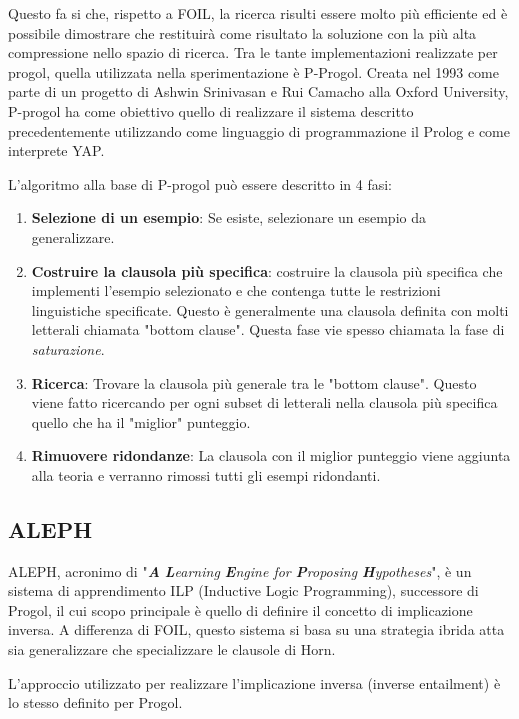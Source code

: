 Questo fa si che, rispetto a FOIL, la ricerca risulti essere molto più efficiente ed è possibile dimostrare che restituirà come risultato la soluzione con la più alta compressione nello spazio di ricerca.
\nocite{wiki:progol}
\nocite{pprogol}
Tra le tante implementazioni realizzate per progol, quella utilizzata nella sperimentazione è P-Progol. Creata nel 1993 come parte di un progetto di Ashwin Srinivasan e Rui Camacho alla Oxford University, P-progol ha come obiettivo quello di realizzare il sistema descritto precedentemente utilizzando come linguaggio di programmazione il Prolog e come interprete YAP.

L'algoritmo alla base di P-progol può essere descritto in 4 fasi:

\begin{enumerate}
	\item \textbf{Selezione di un esempio}: Se esiste, selezionare un esempio da generalizzare.
	\item \textbf{Costruire la clausola più specifica}: costruire la clausola più specifica che implementi l'esempio selezionato e che contenga tutte le restrizioni linguistiche specificate. Questo è generalmente una clausola definita con molti letterali chiamata "bottom clause". Questa fase vie spesso chiamata la fase di \emph{saturazione}.
	\item \textbf{Ricerca}: Trovare la clausola più generale tra le "bottom clause". Questo viene fatto ricercando per ogni subset di letterali nella clausola più specifica quello che ha il "miglior" punteggio.
	\item \textbf{Rimuovere ridondanze}: La clausola con il miglior punteggio viene aggiunta alla teoria e verranno rimossi tutti gli esempi ridondanti.
\end{enumerate}

\subsection{ALEPH}
\label{sistemi:aleph}
ALEPH, acronimo di "\emph{\textbf{A} \textbf{L}earning \textbf{E}ngine for \textbf{P}roposing \textbf{H}ypotheses}", è un sistema di apprendimento ILP (Inductive Logic Programming), successore di Progol, il cui scopo principale è quello di definire il concetto di implicazione inversa.
A differenza di FOIL, questo sistema si basa su una strategia ibrida atta sia generalizzare che specializzare le clausole di Horn. 

L'approccio utilizzato per realizzare l'implicazione inversa (inverse entailment) è lo stesso definito per Progol.

